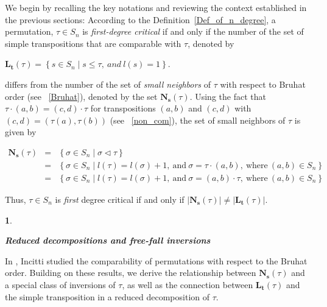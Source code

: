 \documentclass[a4 paper,12pt]{article}
\newcommand{\sma}{\triangleleft}
\newcommand{\ma}{\leqslant}
\newtheorem{numeris}{}[section]
\begin{document}
We begin by recalling the key notations and reviewing the context established in the previous sections: According to the Definition~\ref{Def_of_n_degree}, a permutation,  $\tau\in S_n$  is \textit{first-degree critical}   if and only if 
the number  of  the set of simple 
transpositions that are comparable with $\tau$, 
denoted by  
\begin{center}
$\textbf{L}_{\textbf{t}}(\tau) = \left\{s \in S_n \mid s \ma \tau, \ and \ l(s)=1 \right\}$.
\end{center}
 differs from the number of the set of  \textit{small neighbors} of $\tau$ with respect to Bruhat order (see ~\ref{Bruhat}), denoted by the set  $\textbf{N}_{\textbf{s}}(\tau)$. 
Using the fact that $\tau \cdot (a,b) = (c,d)\cdot\tau $  for transpositions $(a,b)$ and $(c,d)$ with  $(c,d) =(\tau(a),\tau(b))$ (see ~\ref{non_com}),  the set of small neighbors of $\tau$ is given by
\begin{center}
$
\begin{array}{ccl}
	\textbf{N}_{\textbf{s}}(\tau) &=&\left\{\sigma \in S_n \mid \sigma \sma \tau \right\} \\[1mm]
	&=& \left\{\sigma \in S_n \mid  l(\tau) = l(\sigma)+1, \ \textrm{and} \  \sigma = \tau\cdot (a,b), \ \textrm{where} \  (a,b)\in S_n \right\} \\[1mm]
	&=&  \left\{\sigma \in S_n \mid  l(\tau) = l(\sigma)+1, \ \textrm{and} \  \sigma = (a,b) \cdot \tau , \ \textrm{where} \ (a,b)\in S_n \right\}
\end{array}
$
\end{center}
Thus,  $\tau \in S_n$ is \textit{first} degree critical if and only if $\left|\textbf{N}_{\textbf{s}}(\tau)\right|\neq \left|\textbf{L}_{\textbf{t}}(\tau)\right|$.







\begin{numeris}\begin{center} \textbf{Reduced decompositions and free-fall inversions}\end{center}\end{numeris}
\begin{small}In \cite{Fed}, Incitti studied the comparability of permutations with respect to the Bruhat order. Building on these results, we derive the relationship between  $\textbf{N}_{\textbf{s}}(\tau)$ and a special class of inversions of $\tau$, as well as the connection between $\textbf{L}_{\textbf{t}}(\tau)$ and the simple transposition in a reduced decomposition of $\tau$.
\end{small}
\end{document}
